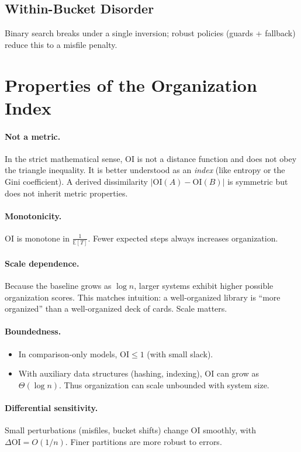 \documentclass[11pt]{article}
\begin{document}
\subsection{Within-Bucket Disorder}
Binary search breaks under a single inversion; robust policies (guards +
fallback) reduce this to a misfile penalty.

\section{Properties of the Organization Index}
\paragraph{Not a metric.}
In the strict mathematical sense, $\mathrm{OI}$ is not a distance function and
does not obey the triangle inequality. It is better understood as an \emph{index}
(like entropy or the Gini coefficient). A derived dissimilarity
$|\mathrm{OI}(A)-\mathrm{OI}(B)|$ is symmetric but does not inherit metric
properties.

\paragraph{Monotonicity.}
$\mathrm{OI}$ is monotone in $\tfrac{1}{\mathbb{E}[T]}$. Fewer expected steps
always increases organization.

\paragraph{Scale dependence.}
Because the baseline grows as $\log n$, larger systems exhibit higher possible
organization scores. This matches intuition: a well-organized library is
``more organized'' than a well-organized deck of cards. Scale matters.

\paragraph{Boundedness.}
\begin{itemize}
  \item In comparison-only models, $\mathrm{OI}\leq 1$ (with small slack).
  \item With auxiliary data structures (hashing, indexing), $\mathrm{OI}$ can
  grow as $\Theta(\log n)$. Thus organization can scale unbounded with system
  size.
\end{itemize}

\paragraph{Differential sensitivity.}
Small perturbations (misfiles, bucket shifts) change $\mathrm{OI}$ smoothly,
with $\Delta \mathrm{OI}=O(1/n)$. Finer partitions are more robust to errors.
\end{document}

